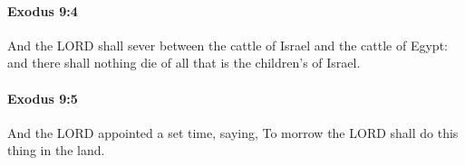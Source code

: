 		\paragraph{Exodus 9:4} %
			\label{EXODUS-9-4}

			And the LORD shall sever between the cattle of Israel and the cattle of Egypt: and there shall nothing die of all that is the children's of Israel.


		\paragraph{Exodus 9:5} %
			\label{EXODUS-9-5}

			And the LORD appointed a set time, saying, To morrow the LORD shall do this thing in the land.


